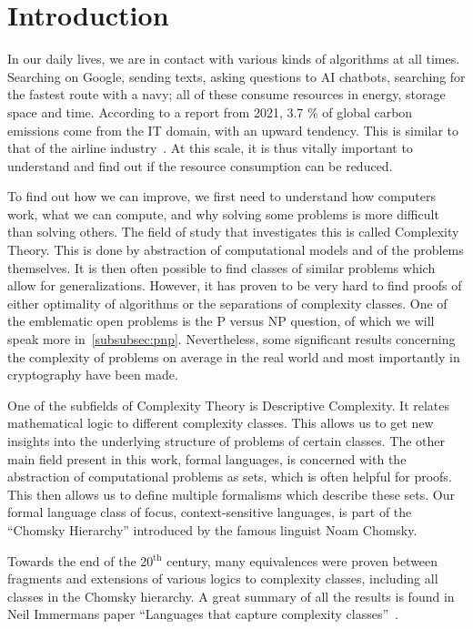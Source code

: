 \chapter{Introduction}\label{ch:intro}

In our daily lives, we are in contact with various kinds of algorithms at all times.
Searching on Google, sending texts, asking questions to AI chatbots, searching for the fastest route with a navy; all of these consume resources in energy, storage space and time.
According to a report from 2021, 3.7 \% of global carbon emissions come from the IT domain, with an upward tendency.
This is similar to that of the airline industry~\cite{webFootprint}.
At this scale, it is thus vitally important to understand and find out if the resource consumption can be reduced.

To find out how we can improve, we first need to understand how computers work, what we can compute, and why solving some problems is more difficult than solving others.
The field of study that investigates this is called Complexity Theory.
This is done by abstraction of computational models and of the problems themselves.
It is then often possible to find classes of similar problems which allow for generalizations.
However, it has proven to be very hard to find proofs of either optimality of algorithms or the separations of complexity classes.
One of the emblematic open problems is the P versus NP question, of which we will speak more in~\cref{subsubsec:pnp}.
Nevertheless, some significant results concerning the complexity of problems on average in the real world and most importantly in cryptography have been made.

One of the subfields of Complexity Theory is Descriptive Complexity.
It relates mathematical logic to different complexity classes.
This allows us to get new insights into the underlying structure of problems of certain classes.
The other main field present in this work, formal languages, is concerned with the abstraction of computational problems as sets, which is often helpful for proofs.
This then allows us to define multiple formalisms which describe these sets.
Our formal language class of focus, context-sensitive languages, is part of the ``Chomsky Hierarchy'' introduced by the famous linguist Noam Chomsky.

Towards the end of the 20$^{\text{th}}$ century, many equivalences were proven between fragments and extensions of various logics to complexity classes, including all classes in the Chomsky hierarchy.
A great summary of all the results is found in Neil Immermans paper ``Languages that capture complexity classes''~\cite{Immerman1987}.

